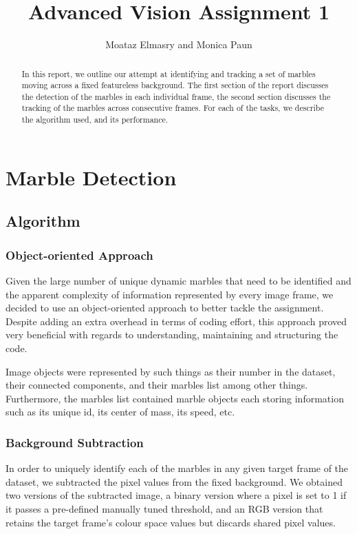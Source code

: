 \documentclass[10pt,a4paper,onecolumn]{report}
\author{Moataz Elmasry and Monica Paun}
\title{Advanced Vision Assignment 1}
\begin{document}
\lstset{language=Matlab} 

\maketitle

\begin{abstract}

In this report, we outline our attempt at identifying and tracking a set of marbles moving across a fixed featureless background. The first section of the report discusses the detection of the marbles in each individual frame, the second section discusses the tracking of the marbles across consecutive frames. For each of the tasks, we describe the algorithm used, and its performance.

\end{abstract}

\chapter{Marble Detection}

\section{Algorithm}

\subsection{Object-oriented Approach}

Given the large number of unique dynamic marbles that need to be identified and the apparent complexity of information represented by every image frame, we decided to use an object-oriented approach to better tackle the assignment. Despite adding an extra overhead in terms of coding effort, this approach proved very beneficial with regards to understanding, maintaining and structuring the code.

Image objects were represented by such things as their number in the dataset, their connected components, and their marbles list among other things. Furthermore, the marbles list contained marble objects each storing information such as its unique id, its center of mass, its speed, etc.

\subsection{Background Subtraction}

In order to uniquely identify each of the marbles in any given target frame of the dataset, we subtracted the pixel values from the fixed background. We obtained two versions of the subtracted image, a binary version where a pixel is set to 1 if it passes a pre-defined manually tuned threshold, and an RGB version that retains the target frame's colour space values but discards shared pixel values.
\end{document}

